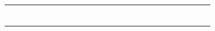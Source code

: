 ﻿\documentclass[12pt]{article}
\begin{document}
\begin{tabular}{|l|p{3.5cm}|p{3.5cm}|p{3.5cm}|p{1.5cm}|p{1.5cm}|l|l|l|l|l|l|l|l|l|l|l|l|l|l|l|l|}
 &  &  &  &  &  & & & & & & & & & & & & & & & & \\ \hline
 &  &  &  &  &  & & & & & & & & & & & & & & & & \\ \hline
 &  &  &  &  &  & & & & & & & & & & & & & & & & \\ \hline
 &  &  &  &  &  & & & & & & & & & & & & & & & & \\ \hline
 &  &  &  &  &  & & & & & & & & & & & & & & & & \\ \hline
 &  &  &  &  &  & & & & & & & & & & & & & & & & \\ \hline
 &  &  &  &  &  & & & & & & & & & & & & & & & & \\ \hline
\end{tabular}

\pagebreak

\end{document}
